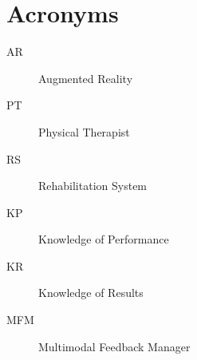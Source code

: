 
\chapter*{Acronyms}

\begin{singlespace}

\begin{description}

\item[AR]{Augmented Reality}
\item[PT]{Physical Therapist}
\item[RS]{Rehabilitation System}
\item[KP]{Knowledge of Performance}
\item[KR]{Knowledge of Results}
\item[MFM]{Multimodal Feedback Manager}

\end{description}

\end{singlespace}
